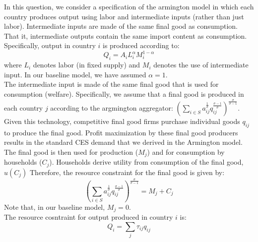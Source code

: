 \documentclass[answers]{exam}
\begin{document}
\begin{questions}
\begin{parts}
\begin{solution}
          \end{solution}

    \end{parts}
    \question In this question, we consider a specification of the armington model in which each country produces output 
    using labor and intermediate inputs (rather than just labor). Intermediate inputs are made of the same final good as consumption. That it, intermediate outputs contain the same import content as consumption.\\
    Specifically, output in country $i$ is produced according to:
    $$Q_i = A_i L_i^\alpha M_i^{1-\alpha}$$
    where $L_i$ denotes labor (in fixed supply) and $M_i$ denotes the use of intermediate input. In our baseline model, we have assumed $\alpha = 1$.\\
    The intermediate input is made of the same final good that is used for consumption (welfare). Specifically, we assume that a final good is produced in each country $j$ according to the argmington aggregator: $(\sum_{i\in S} a_{ij}^{\frac{1}{\sigma}} q_{ij}^\frac{\sigma-1}{\sigma})^{\frac{\sigma}{\sigma - 1}}$. Given this technology, 
    competitive final good firms purchase individual goods $q_{ij}$ to produce the final good.
    Profit maximization
    by these final good producers results in the standard CES demand that we derived in the
    Armington model. The final good is then used for production ($M_j$) and for consumption
    by households ($C_j$). Households derive utility from consumption of the final good, $u(C_j)$
    Therefore, the resource constraint for the final good is given by:
    $$(\sum_{i\in S} a_{ij}^{\frac{1}{\sigma}} q_{ij}^\frac{\sigma-1}{\sigma})^{\frac{\sigma}{\sigma - 1}} = M_j + C_j$$
    Note that, in our baseline model, $M_j = 0$.\\ 
    The resource cosntraint for output produced in country $i$ is:
    $$Q_i = \sum_{j} \tau_{ij} q_{ij}$$
    \begin{parts}

\end{parts}
\end{questions}
\end{document}
